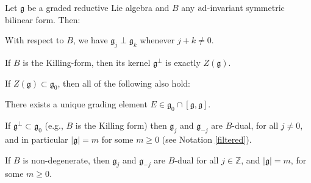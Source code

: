 \documentclass[leqno,12pt]{amsart} %
\begin{document}
\begin{lemma}
  Let ${\mathfrak g} $ be a graded reductive Lie algebra
  and $B$ any $\operatorname{ad}$-invariant symmetric bilinear form. Then:
  \begin{conditions}
  \item\label{ira1} With respect to $B$, we have ${\mathfrak g}_j \perp {\mathfrak g}_k$
    whenever $j+k \ne 0$.
  \item\label{ira2} If $B$ is the Killing-form, then its kernel ${\mathfrak g} ^\perp$ is
    exactly $Z({\mathfrak g})$.
  \end{conditions}
  If $Z({\mathfrak g}) \subset {\mathfrak g}_0$, then all of the following also hold:
 \begin{conditions}
  \item\label{ira0} There exists a unique grading element
    $E \in {\mathfrak g}_0\cap[{\mathfrak g}, {\mathfrak g}]$.
  \item\label{ira3} If ${\mathfrak g}^\perp \subset {\mathfrak g}_0$ (e.g., $B$ is the
    Killing form) then ${\mathfrak g}_j$ and ${\mathfrak g}_{-j}$ are $B$-dual, for all
    $j\ne 0$, and in particular $|{\mathfrak g}| = m$ for some $m \ge 0$ (see Notation
    \ref{filtered}).
  \item\label{ira4} If $B$ is non-degenerate, then ${\mathfrak g}_j$ and
    ${\mathfrak g}_{-j}$ are $B$-dual for all $j \in {\mathbb Z}$, and
    $|{\mathfrak g}| = m$, for some $m\ge 0$.
  \end{conditions}
\end{lemma}
\end{document}
